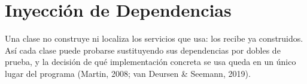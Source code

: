 \section{Inyección de Dependencias}

Una clase no construye ni localiza los servicios que usa: los recibe ya construidos. Así cada clase puede probarse sustituyendo sus dependencias por dobles de prueba, y la decisión de qué implementación concreta se usa queda en un único lugar del programa (Martin, 2008; van Deursen \& Seemann, 2019).





